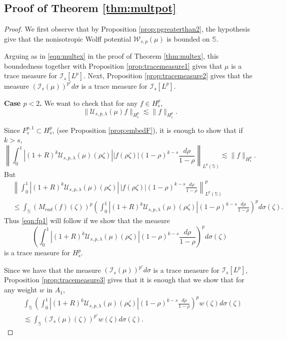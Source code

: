 \documentclass[12pt,twoside,leqno,final]{amsart}
\theoremstyle{plain}
\begin{document}
\subsection{Proof of Theorem \ref{thm:multpot}}
\begin{proof}
We first observe that by Proposition \ref{prop:pgreaterthan2}, the hypothesis give that the nonisotropic Wolff potential ${\mathcal W}_{s,p}(\mu)$ is bounded on ${{\mathbb S}}$.

Arguing as in \eqref{eqn:multex} in the proof of Theorem \ref{thm:multex},  this boundedness together with Proposition \ref{prop:tracemeasure1} gives that $\mu$ is a trace measure for $\mathcal{I}_s[L^p]$. Next, Proposition \ref{prop:tracemeasure2} gives that the measure $(\mathcal{I}_s(\mu))^{p'}d\sigma$ is a trace measure for $\mathcal{I}_s[L^p]$.

 {\bf Case $p< 2$.}
 We want to check that for any $f\in H_s^p$,
$$\|{\mathcal U}_{s,p,\lambda}(\mu)f\|_ {H_s^p} \lesssim \|f\|_{H_s^p}.$$

Since $F_s^{p,1}\subset H_s^p$, (see Proposition \ref{prop:embedF}),  it is enough to show that if $k>s$,
\begin{equation}\label{eqn:fp1}
\left\|  \int_0^1|(1+R)^k {\mathcal U}_{s,p,\lambda}(\mu)(\rho\zeta)||f(\rho\zeta)|(1-\rho)^{k-s} \frac{d\rho}{1-\rho} \right\|_{L^p({{\mathbb S}})}\lesssim \|f\|_{H_s^p}.
\end{equation}
But 
\begin{equation*}\begin{split}&
\left\| \int_0^1 |(1+R)^k {\mathcal U}_{s,p,\lambda}(\mu)(\rho\zeta)|\,|f(\rho\zeta)|(1-\rho)^{k-s} \frac{d\rho}{1-\rho} \right\|_{L^p({{\mathbb S}})}^p\\&
\leq  \int_{{\mathbb S}} (M_{rad}(f)(\zeta))^p \left(\int_0^1|(1+R)^k {\mathcal U}_{s,p,\lambda}(\mu)(\rho\zeta)|(1-\rho)^{k-s} \frac{d\rho}{1-\rho}\right)^pd\sigma(\zeta)   .
\end{split}\end{equation*}
Thus \eqref{eqn:fp1} will follow if we show that the measure 
\begin{equation}\label{eqn:tracemeasurefp1}\left(\int_0^1|(1+R)^k {\mathcal U}_{s,p,\lambda}(\mu)(\rho\zeta)|(1-\rho)^{k-s} \frac{d\rho}{1-\rho}\right)^pd\sigma(\zeta)
\end{equation}  
is a trace measure for $H_s^p$.

Since we have that the measure $(\mathcal{I}_s(\mu))^{p'}d\sigma$ is a trace measure for $\mathcal{I}_s[L^p]$, Proposition \ref{prop:tracemeasure3} gives that it is enough that we show that for any  weight $w$ in $A_1$,
\begin{equation}\begin{split}\label{eqn:estimateweight}
&\int_{{\mathbb S}}\left(\int_0^1|(1+R)^k {\mathcal U}_{s,p,\lambda}(\mu)(\rho\zeta)|(1-\rho)^{k-s} \frac{d\rho}{1-\rho}\right)^pw(\zeta)d\sigma(\zeta) \\&\lesssim \int_{{\mathbb S}}(\mathcal{I}_s(\mu)(\zeta))^{p'}w(\zeta)d\sigma(\zeta).
\end{split}\end{equation}


\end{proof}
\end{document}
